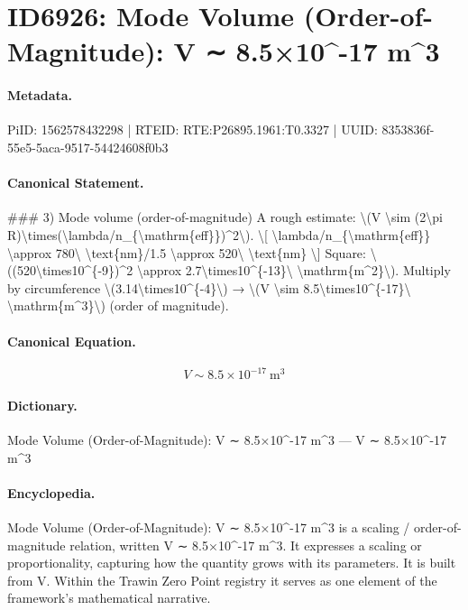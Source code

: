 \section*{ID6926: Mode Volume (Order-of-Magnitude): V ∼ 8.5×10\textasciicircum{}-17 m\textasciicircum{}3}
\paragraph{Metadata.}
PiID: 1562578432298 | RTEID: RTE:P26895.1961:T0.3327 | UUID: 8353836f-55e5-5aca-9517-54424608f0b3

\paragraph{Canonical Statement.}
\#\#\# 3) Mode volume (order-of-magnitude) A rough estimate: \textbackslash{}(V \textbackslash{}sim (2\textbackslash{}pi R)\textbackslash{}times(\textbackslash{}lambda/n\_\{\textbackslash{}mathrm\{eff\}\})\textasciicircum{}2\textbackslash{}). \textbackslash{}[ \textbackslash{}lambda/n\_\{\textbackslash{}mathrm\{eff\}\} \textbackslash{}approx 780\textbackslash{} \textbackslash{}text\{nm\}/1.5 \textbackslash{}approx 520\textbackslash{} \textbackslash{}text\{nm\} \textbackslash{}] Square: \textbackslash{}((520\textbackslash{}times10\textasciicircum{}\{-9\})\textasciicircum{}2 \textbackslash{}approx 2.7\textbackslash{}times10\textasciicircum{}\{-13\}\textbackslash{} \textbackslash{}mathrm\{m\textasciicircum{}2\}\textbackslash{}). Multiply by circumference \textbackslash{}(3.14\textbackslash{}times10\textasciicircum{}\{-4\}\textbackslash{}) → \textbackslash{}(V \textbackslash{}sim 8.5\textbackslash{}times10\textasciicircum{}\{-17\}\textbackslash{} \textbackslash{}mathrm\{m\textasciicircum{}3\}\textbackslash{}) (order of magnitude).

\paragraph{Canonical Equation.}
\[
V \sim 8.5\times10^{-17}\ \mathrm{m^3}
\]

\paragraph{Dictionary.}
Mode Volume (Order-of-Magnitude): V ∼ 8.5×10\textasciicircum{}-17 m\textasciicircum{}3 — V ∼ 8.5×10\textasciicircum{}-17 m\textasciicircum{}3

\paragraph{Encyclopedia.}
Mode Volume (Order-of-Magnitude): V ∼ 8.5×10\textasciicircum{}-17 m\textasciicircum{}3 is a scaling / order-of-magnitude relation, written V ∼ 8.5×10\textasciicircum{}-17 m\textasciicircum{}3. It expresses a scaling or proportionality, capturing how the quantity grows with its parameters. It is built from V. Within the Trawin Zero Point registry it serves as one element of the framework's mathematical narrative.
